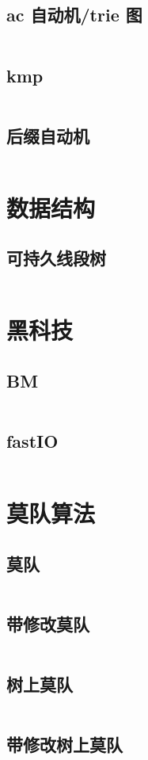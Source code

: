 \subsection{ac 自动机/trie 图}
\inputminted{cpp}{\source/coldwater/string/ac_dfa.cpp}
\subsection{kmp}
\inputminted{cpp}{\source/coldwater/string/kmp.cpp}
\subsection{后缀自动机}
\inputminted{cpp}{\source/coldwater/string/sam.cpp}
\section{数据结构}
\subsection{可持久线段树}
\inputminted{cpp}{\source/coldwater/data_structure/pst.cpp}
\section{黑科技}
\subsection{BM}
\inputminted{cpp}{\source/coldwater/black_technology/BM.cpp}
\subsection{fastIO}
\inputminted{cpp}{\source/coldwater/black_technology/fastIO.cpp}
\section{莫队算法}
\subsection{莫队}
\inputminted{cpp}{\source/coldwater/Mo's_Algorithm/Mo0.cpp}
\subsection{带修改莫队}
\inputminted{cpp}{\source/coldwater/Mo's_Algorithm/Mo1.cpp}
\subsection{树上莫队}
\inputminted{cpp}{\source/coldwater/Mo's_Algorithm/Mo2.cpp}
\subsection{带修改树上莫队}
\inputminted{cpp}{\source/coldwater/Mo's_Algorithm/Mo3.cpp}